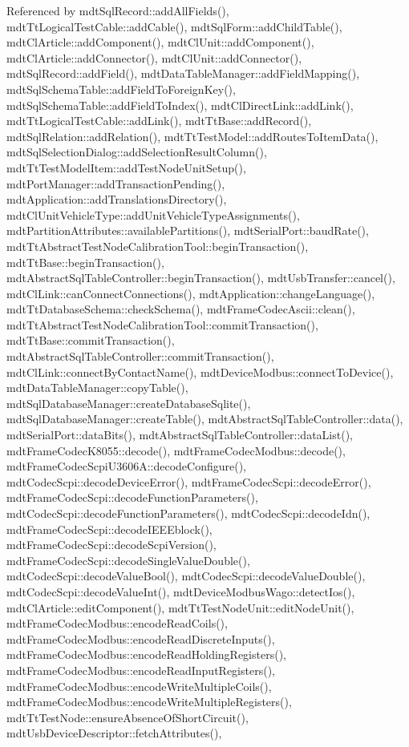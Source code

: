 Referenced by mdt\-Sql\-Record\-::add\-All\-Fields(), mdt\-Tt\-Logical\-Test\-Cable\-::add\-Cable(), mdt\-Sql\-Form\-::add\-Child\-Table(), mdt\-Cl\-Article\-::add\-Component(), mdt\-Cl\-Unit\-::add\-Component(), mdt\-Cl\-Article\-::add\-Connector(), mdt\-Cl\-Unit\-::add\-Connector(), mdt\-Sql\-Record\-::add\-Field(), mdt\-Data\-Table\-Manager\-::add\-Field\-Mapping(), mdt\-Sql\-Schema\-Table\-::add\-Field\-To\-Foreign\-Key(), mdt\-Sql\-Schema\-Table\-::add\-Field\-To\-Index(), mdt\-Cl\-Direct\-Link\-::add\-Link(), mdt\-Tt\-Logical\-Test\-Cable\-::add\-Link(), mdt\-Tt\-Base\-::add\-Record(), mdt\-Sql\-Relation\-::add\-Relation(), mdt\-Tt\-Test\-Model\-::add\-Routes\-To\-Item\-Data(), mdt\-Sql\-Selection\-Dialog\-::add\-Selection\-Result\-Column(), mdt\-Tt\-Test\-Model\-Item\-::add\-Test\-Node\-Unit\-Setup(), mdt\-Port\-Manager\-::add\-Transaction\-Pending(), mdt\-Application\-::add\-Translations\-Directory(), mdt\-Cl\-Unit\-Vehicle\-Type\-::add\-Unit\-Vehicle\-Type\-Assignments(), mdt\-Partition\-Attributes\-::available\-Partitions(), mdt\-Serial\-Port\-::baud\-Rate(), mdt\-Tt\-Abstract\-Test\-Node\-Calibration\-Tool\-::begin\-Transaction(), mdt\-Tt\-Base\-::begin\-Transaction(), mdt\-Abstract\-Sql\-Table\-Controller\-::begin\-Transaction(), mdt\-Usb\-Transfer\-::cancel(), mdt\-Cl\-Link\-::can\-Connect\-Connections(), mdt\-Application\-::change\-Language(), mdt\-Tt\-Database\-Schema\-::check\-Schema(), mdt\-Frame\-Codec\-Ascii\-::clean(), mdt\-Tt\-Abstract\-Test\-Node\-Calibration\-Tool\-::commit\-Transaction(), mdt\-Tt\-Base\-::commit\-Transaction(), mdt\-Abstract\-Sql\-Table\-Controller\-::commit\-Transaction(), mdt\-Cl\-Link\-::connect\-By\-Contact\-Name(), mdt\-Device\-Modbus\-::connect\-To\-Device(), mdt\-Data\-Table\-Manager\-::copy\-Table(), mdt\-Sql\-Database\-Manager\-::create\-Database\-Sqlite(), mdt\-Sql\-Database\-Manager\-::create\-Table(), mdt\-Abstract\-Sql\-Table\-Controller\-::data(), mdt\-Serial\-Port\-::data\-Bits(), mdt\-Abstract\-Sql\-Table\-Controller\-::data\-List(), mdt\-Frame\-Codec\-K8055\-::decode(), mdt\-Frame\-Codec\-Modbus\-::decode(), mdt\-Frame\-Codec\-Scpi\-U3606\-A\-::decode\-Configure(), mdt\-Codec\-Scpi\-::decode\-Device\-Error(), mdt\-Frame\-Codec\-Scpi\-::decode\-Error(), mdt\-Frame\-Codec\-Scpi\-::decode\-Function\-Parameters(), mdt\-Codec\-Scpi\-::decode\-Function\-Parameters(), mdt\-Codec\-Scpi\-::decode\-Idn(), mdt\-Frame\-Codec\-Scpi\-::decode\-I\-E\-E\-Eblock(), mdt\-Frame\-Codec\-Scpi\-::decode\-Scpi\-Version(), mdt\-Frame\-Codec\-Scpi\-::decode\-Single\-Value\-Double(), mdt\-Codec\-Scpi\-::decode\-Value\-Bool(), mdt\-Codec\-Scpi\-::decode\-Value\-Double(), mdt\-Codec\-Scpi\-::decode\-Value\-Int(), mdt\-Device\-Modbus\-Wago\-::detect\-Ios(), mdt\-Cl\-Article\-::edit\-Component(), mdt\-Tt\-Test\-Node\-Unit\-::edit\-Node\-Unit(), mdt\-Frame\-Codec\-Modbus\-::encode\-Read\-Coils(), mdt\-Frame\-Codec\-Modbus\-::encode\-Read\-Discrete\-Inputs(), mdt\-Frame\-Codec\-Modbus\-::encode\-Read\-Holding\-Registers(), mdt\-Frame\-Codec\-Modbus\-::encode\-Read\-Input\-Registers(), mdt\-Frame\-Codec\-Modbus\-::encode\-Write\-Multiple\-Coils(), mdt\-Frame\-Codec\-Modbus\-::encode\-Write\-Multiple\-Registers(), mdt\-Tt\-Test\-Node\-::ensure\-Absence\-Of\-Short\-Circuit(), mdt\-Usb\-Device\-Descriptor\-::fetch\-Attributes(), 
